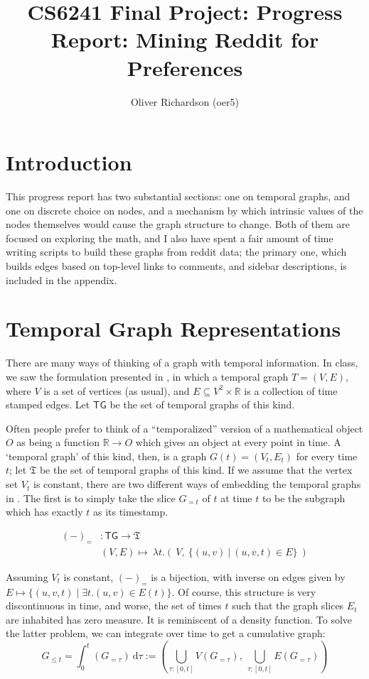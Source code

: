 \documentclass{article}
\author{Oliver Richardson (oer5)}
\title{CS6241 Final Project: Progress Report: Mining Reddit for Preferences}
\theoremstyle{definition}
\begin{document}
	\maketitle
	
	\section{Introduction}
		
	This progress report has two substantial sections: one on temporal graphs, and one on discrete choice on nodes, and a mechanism by which intrinsic values of the nodes themselves would cause the graph structure to change. Both of them are focused on exploring the math, and I also have spent a fair amount of time writing scripts to build these graphs from reddit data; the primary one, which builds edges based on top-level links to comments, and sidebar descriptions, is included in the appendix.
	
	\section{Temporal Graph Representations}
	There are many ways of thinking of a graph with temporal information. In class, we saw the formulation presented in \cite{paranjape2017motifs}, in which a temporal graph $T = (V, E)$, where $V$ is a set of vertices (as usual), and $E \subseteq V^2 \times  \mathbb R$ is a collection of time stamped edges. Let $\mathsf{TG}$ be the set of temporal graphs of this kind.
	
	Often people prefer to think of a ``temporalized'' version of a mathematical object $O$ as being a function $\mathbb R \to O$ which gives an object at every point in time. A `temporal graph' of this kind, then, is a graph $G(t) = (V_t, E_t)$ for every time $t$; let $\mathfrak{T}$ be the set of temporal graphs of this kind. If we assume that the vertex set $V_t$ is constant, there are two different ways of embedding the temporal graphs in \cite{paranjape2017motifs}. The first is to simply take the slice $G_{=t}$ of $t$ at time $t$ to be the subgraph which has exactly $t$ as its timestamp.
	
	\begin{align*}
		(-)_{=}&: \mathsf{TG} \to \mathfrak T \\
		&(V, E) \mapsto ~\lambda t.\left( ~V,~\Big\{ (u,v)~\Big|~(u,v,t)\in E \Big\}~\right)
	\end{align*}
	
	Assuming $V_t$ is constant, $(-)_=$ is a bijection, with inverse on edges given by $E \mapsto \{ (u,v,t) \mid \exists t. (u,v) \in E(t) \}$. Of course, this structure is very discontinuous in time, and worse, the set of times $t$ such that the graph slices $E_t$ are inhabited has zero measure. It is reminiscent of a density function. To solve the latter problem, we can integrate over time to get a cumulative graph:
	\[ G_{\leq t} =  \int_0^t (G_{=\tau} )~\mathrm d \tau :=
		 \left( \bigcup_{\tau : [0,t]} V(G_{=\tau}), ~\bigcup_{\tau : [0,t]} E(G_{=\tau}) \right)\]
	
\end{document}
